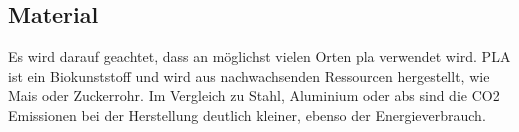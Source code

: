 



\subsection{Material}

Es wird darauf geachtet, dass an möglichst vielen Orten \acrfull{pla} verwendet wird. PLA ist ein Biokunststoff und wird aus nachwachsenden Ressourcen hergestellt, wie Mais oder Zuckerrohr.\cite{pla} Im Vergleich zu Stahl, Aluminium oder \acrfull{abs} sind die CO2 Emissionen bei der Herstellung deutlich kleiner, ebenso der Energieverbrauch.

